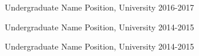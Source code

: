 
\begin{cvhonors}

  \cvhonor
    {Undergraduate Name} %
    {Position, University} %
    {} %
    {2016-2017} %

  \cvhonor
    {Undergraduate Name} %
    {Position, University} %
    {} %
    {2014-2015} %

  \cvhonor
    {Undergraduate Name} %
    {Position, University} %
    {} %
    {2014-2015} %

\end{cvhonors}